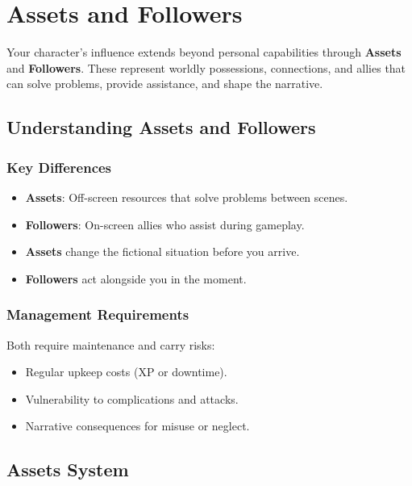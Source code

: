 
\chapter{Assets and Followers}
\label{ch:assets-followers}

\begin{multicols}{2}

Your character's influence extends beyond personal capabilities through \textbf{Assets} and \textbf{Followers}. These represent worldly possessions, connections, and allies that can solve problems, provide assistance, and shape the narrative.

\section{Understanding Assets and Followers}

\subsection*{Key Differences}
\begin{itemize}
\item \textbf{Assets}: Off-screen resources that solve problems between scenes.
\item \textbf{Followers}: On-screen allies who assist during gameplay.
\item \textbf{Assets} change the fictional situation before you arrive.
\item \textbf{Followers} act alongside you in the moment.
\end{itemize}

\subsection*{Management Requirements}
Both require maintenance and carry risks:
\begin{itemize}
\item Regular upkeep costs (XP or downtime).
\item Vulnerability to complications and attacks.
\item Narrative consequences for misuse or neglect.
\end{itemize}

\section{Assets System}


\end{multicols}
